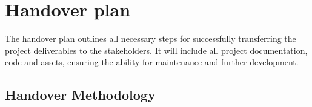 \section{Handover plan}
\label{section:handover_plan}

The handover plan outlines all necessary steps for successfully transferring the project deliverables to the stakeholders. It will include all project documentation, code and assets, ensuring the ability for maintenance and further development. 


\begin{comment}
\helper{How to deliver the product to the client and implement it into the environment it is meant for. The following subsections is an general simple example}

\noindent This Handover Plan outlines the systematic process of transferring all project deliverables, documentation, tools, and knowledge to the project owner at the end of the project or a project phase. The objective is to ensure a smooth transition, preserving all the hard work done on the project and providing a firm basis for future work. Understanding this plan will ensure that all team members know what is required in the final stages of the project.
\end{comment}

\subsection{Handover Methodology}

